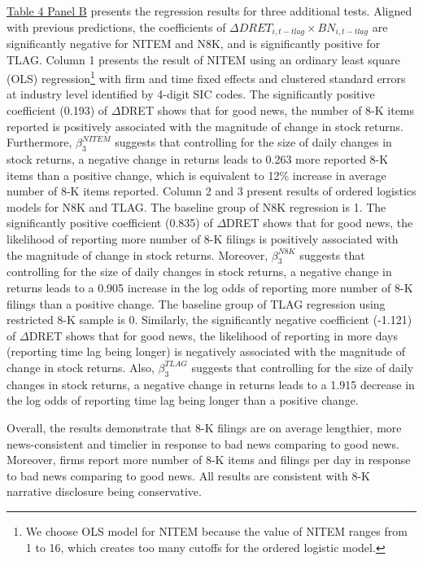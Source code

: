 \documentclass[a4paper]{article}
\begin{document}
\begin{spacing}{2}
\hyperref[T4PB]{Table 4 Panel B} presents the regression results for three additional tests. Aligned with previous predictions, the coefficients of $\Delta DRET_{i,t-tlag}\times BN_{i,t-tlag}$ are significantly negative for NITEM and N8K, and is significantly positive for TLAG. Column 1 presents the result of NITEM using an ordinary least square (OLS) regression\footnote{We choose OLS model for NITEM because the value of NITEM ranges from 1 to 16, which creates too many cutoffs for the ordered logistic model.} with firm and time fixed effects and clustered standard errors at industry level identified by 4-digit SIC codes. The significantly positive coefficient (0.193) of $\Delta$DRET shows that for good news, the number of 8-K items reported is positively associated with the magnitude of change in stock returns. Furthermore, $\beta_3^{NITEM}$ suggests that controlling for the size of daily changes in stock returns, a negative change in returns leads to 0.263 more reported 8-K items than a positive change, which is equivalent to 12\% increase in average number of 8-K items reported. Column 2 and 3 present results of ordered logistics models for N8K and TLAG. The baseline group of N8K regression is 1. The significantly positive coefficient (0.835) of $\Delta$DRET shows that for good news, the likelihood of reporting more number of 8-K filings is positively associated with the magnitude of change in stock returns. Moreover, $\beta_3^{N8K}$ suggests that controlling for the size of daily changes in stock returns, a negative change in returns leads to a 0.905 increase in the log odds of reporting more number of 8-K filings than a positive change. The baseline group of TLAG regression using restricted 8-K sample is 0. Similarly, the significantly negative coefficient (-1.121) of $\Delta$DRET shows that for good news, the likelihood of reporting in more days (reporting time lag being longer) is negatively associated with the magnitude of change in stock returns. Also, $\beta_3^{TLAG}$ suggests that controlling for the size of daily changes in stock returns, a negative change in returns leads to a 1.915 decrease in the log odds of reporting time lag being longer than a positive change. 

Overall, the results demonstrate that 8-K filings are on average lengthier, more news-consistent and timelier in response to bad news comparing to good news. Moreover, firms report more number of 8-K items and filings per day in response to bad news comparing to good news. All results are consistent with 8-K narrative disclosure being conservative.

\end{spacing}
\end{document}
